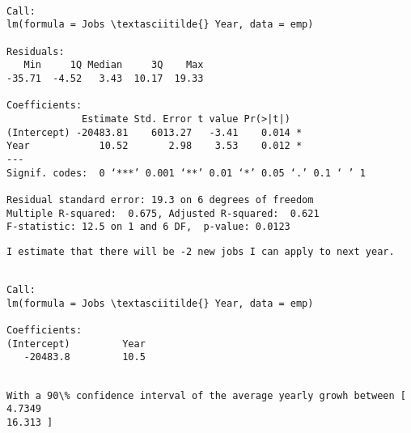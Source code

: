 \documentclass[11pt]{article}
\begin{document}
    
    \begin{Verbatim}[commandchars=\\\{\}]

Call:
lm(formula = Jobs \textasciitilde{} Year, data = emp)

Residuals:
   Min     1Q Median     3Q    Max 
-35.71  -4.52   3.43  10.17  19.33 

Coefficients:
             Estimate Std. Error t value Pr(>|t|)  
(Intercept) -20483.81    6013.27   -3.41    0.014 *
Year            10.52       2.98    3.53    0.012 *
---
Signif. codes:  0 ‘***’ 0.001 ‘**’ 0.01 ‘*’ 0.05 ‘.’ 0.1 ‘ ’ 1

Residual standard error: 19.3 on 6 degrees of freedom
Multiple R-squared:  0.675,	Adjusted R-squared:  0.621 
F-statistic: 12.5 on 1 and 6 DF,  p-value: 0.0123

    \end{Verbatim}

    
    \begin{Verbatim}[commandchars=\\\{\}]
I estimate that there will be -2 new jobs I can apply to next year.
    \end{Verbatim}

    
    \begin{Verbatim}[commandchars=\\\{\}]

Call:
lm(formula = Jobs \textasciitilde{} Year, data = emp)

Coefficients:
(Intercept)         Year  
   -20483.8         10.5  

    \end{Verbatim}

    
    \begin{Verbatim}[commandchars=\\\{\}]

With a 90\% confidence interval of the average yearly growh between [ 4.7349
16.313 ]
    \end{Verbatim}

    \begin{center}
    \end{center}
    { \hspace*{\fill} \\}
    
\end{document}
